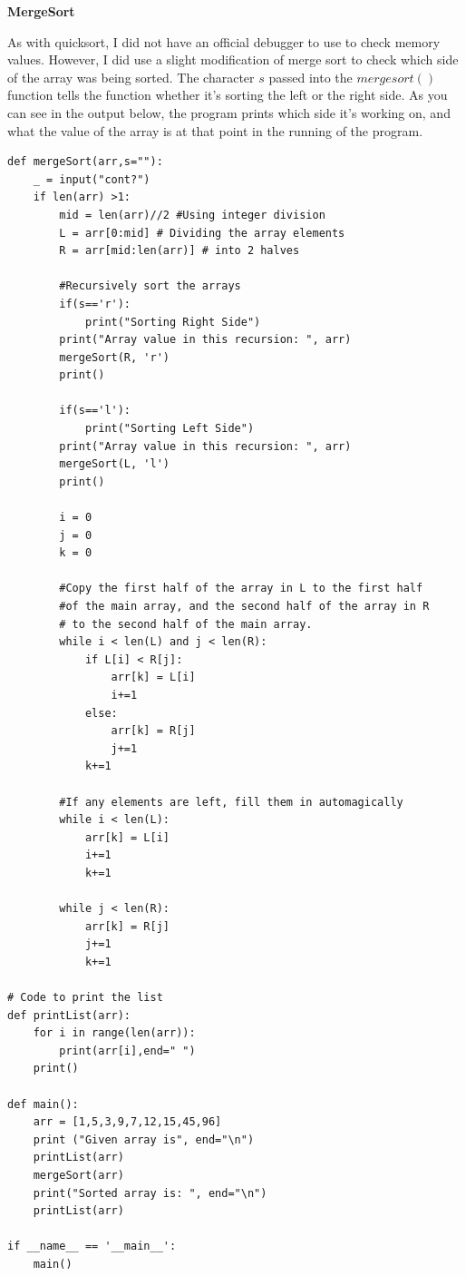 \documentclass{article}
\begin{document}
\textbf{MergeSort}

As with quicksort, I did not have an official debugger to use to check memory values. 
However, I did use a slight modification of merge sort to check which side of the array was being sorted. The character $s$ passed into the $mergesort()$ function tells the function whether it's sorting the left or the right side. As you can see in the output below, the program prints which side it's working on, and what the value of the array is at that point in the running of the program. 

\begin{lstlisting}
def mergeSort(arr,s=""): 
    _ = input("cont?")
    if len(arr) >1: 
        mid = len(arr)//2 #Using integer division
        L = arr[0:mid] # Dividing the array elements  
        R = arr[mid:len(arr)] # into 2 halves 
  
        #Recursively sort the arrays
        if(s=='r'):
            print("Sorting Right Side")
        print("Array value in this recursion: ", arr)
        mergeSort(R, 'r')
        print()

        if(s=='l'):
            print("Sorting Left Side")
        print("Array value in this recursion: ", arr)
        mergeSort(L, 'l')
        print()
  
        i = 0
        j = 0
        k = 0
          
        #Copy the first half of the array in L to the first half 
        #of the main array, and the second half of the array in R
        # to the second half of the main array.  
        while i < len(L) and j < len(R): 
            if L[i] < R[j]: 
                arr[k] = L[i] 
                i+=1
            else: 
                arr[k] = R[j] 
                j+=1
            k+=1
          
        #If any elements are left, fill them in automagically
        while i < len(L): 
            arr[k] = L[i] 
            i+=1
            k+=1
          
        while j < len(R): 
            arr[k] = R[j] 
            j+=1
            k+=1
  
# Code to print the list 
def printList(arr): 
    for i in range(len(arr)):         
        print(arr[i],end=" ") 
    print() 
  
def main():
    arr = [1,5,3,9,7,12,15,45,96]  
    print ("Given array is", end="\n")  
    printList(arr) 
    mergeSort(arr) 
    print("Sorted array is: ", end="\n") 
    printList(arr) 

if __name__ == '__main__':
    main()

\end{lstlisting}
\end{document}
